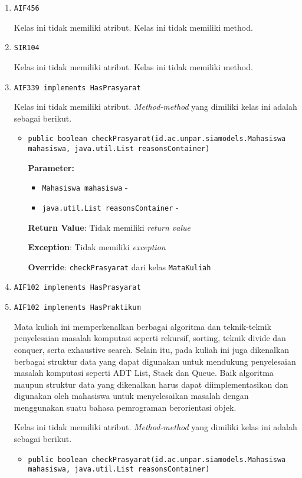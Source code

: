 \documentclass{article}
\begin{document}
\begin{enumerate}
\begin{itemize}
\end{itemize}
\item \texttt{AIF456}



Kelas ini tidak memiliki atribut. Kelas ini tidak memiliki method. \item \texttt{SIR104}



Kelas ini tidak memiliki atribut. Kelas ini tidak memiliki method. \item \texttt{AIF339 implements HasPrasyarat}



Kelas ini tidak memiliki atribut. \textit{Method-method} yang dimiliki kelas ini adalah sebagai berikut.
\begin{itemize}
\item \texttt{public boolean checkPrasyarat(id.ac.unpar.siamodels.Mahasiswa mahasiswa, java.util.List reasonsContainer)}



\textbf{Parameter:}
\begin{itemize}
\item \texttt{Mahasiswa mahasiswa} - 
\item \texttt{java.util.List reasonsContainer} - 
\end{itemize}
\textbf{Return Value}: Tidak memiliki \textit{return value}

\textbf{Exception}: Tidak memiliki \textit{exception}

\textbf{Override}: \texttt{checkPrasyarat} dari kelas \texttt{MataKuliah}

\end{itemize}
\item \texttt{AIF102 implements HasPrasyarat}

\item \texttt{AIF102 implements HasPraktikum}

Mata kuliah ini memperkenalkan berbagai algoritma dan teknik-teknik 
 penyelesaian masalah komputasi seperti rekursif, sorting, teknik divide dan 
 conquer, serta exhaustive search. Selain itu, pada kuliah ini juga 
 dikenalkan berbagai struktur data yang dapat digunakan untuk mendukung 
 penyelesaian masalah komputasi seperti ADT List, Stack dan Queue. Baik 
 algoritma maupun struktur data yang dikenalkan harus dapat diimplementasikan 
 dan digunakan oleh mahasiswa untuk menyelesaikan masalah dengan menggunakan 
 suatu bahasa pemrograman berorientasi objek.

Kelas ini tidak memiliki atribut. \textit{Method-method} yang dimiliki kelas ini adalah sebagai berikut.
\begin{itemize}
\item \texttt{public boolean checkPrasyarat(id.ac.unpar.siamodels.Mahasiswa mahasiswa, java.util.List reasonsContainer)}




\end{itemize}
\end{enumerate}
\end{document}
